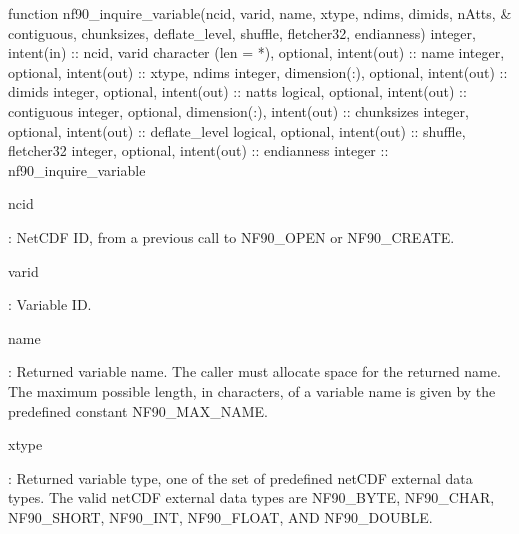\begin{DoxyCode}
\textcolor{keyword}{function }nf90\_inquire\_variable(ncid, varid, name, xtype, ndims, dimids, nAtts, &
     contiguous, chunksizes, deflate\_level, shuffle, fletcher32, endianness)
  \textcolor{keywordtype}{integer}, \textcolor{keywordtype}{intent(in)} :: ncid, varid
  \textcolor{keywordtype}{character (len = *)}, \textcolor{keywordtype}{optional}, \textcolor{keywordtype}{intent(out)} :: name
  \textcolor{keywordtype}{integer}, \textcolor{keywordtype}{optional}, \textcolor{keywordtype}{intent(out)} :: xtype, ndims
  \textcolor{keywordtype}{integer}, \textcolor{keywordtype}{dimension(:)}, \textcolor{keywordtype}{optional}, \textcolor{keywordtype}{intent(out)} :: dimids
  \textcolor{keywordtype}{integer}, \textcolor{keywordtype}{optional}, \textcolor{keywordtype}{intent(out)} :: natts
  \textcolor{keywordtype}{logical}, \textcolor{keywordtype}{optional}, \textcolor{keywordtype}{intent(out)} :: contiguous
  \textcolor{keywordtype}{integer}, \textcolor{keywordtype}{optional}, \textcolor{keywordtype}{dimension(:)}, \textcolor{keywordtype}{intent(out)} :: chunksizes
  \textcolor{keywordtype}{integer}, \textcolor{keywordtype}{optional}, \textcolor{keywordtype}{intent(out)} :: deflate\_level
  \textcolor{keywordtype}{logical}, \textcolor{keywordtype}{optional}, \textcolor{keywordtype}{intent(out)} :: shuffle, fletcher32
  \textcolor{keywordtype}{integer}, \textcolor{keywordtype}{optional}, \textcolor{keywordtype}{intent(out)} :: endianness
  \textcolor{keywordtype}{integer} :: nf90\_inquire\_variable
\end{DoxyCode}


{\ttfamily ncid}

\+: Net\+C\+DF ID, from a previous call to N\+F90\+\_\+\+O\+P\+EN or N\+F90\+\_\+\+C\+R\+E\+A\+TE.

{\ttfamily varid}

\+: Variable ID.

{\ttfamily name}

\+: Returned variable name. The caller must allocate space for the returned name. The maximum possible length, in characters, of a variable name is given by the predefined constant N\+F90\+\_\+\+M\+A\+X\+\_\+\+N\+A\+ME.

{\ttfamily xtype}

\+: Returned variable type, one of the set of predefined net\+C\+DF external data types. The valid net\+C\+DF external data types are N\+F90\+\_\+\+B\+Y\+TE, N\+F90\+\_\+\+C\+H\+AR, N\+F90\+\_\+\+S\+H\+O\+RT, N\+F90\+\_\+\+I\+NT, N\+F90\+\_\+\+F\+L\+O\+AT, A\+ND N\+F90\+\_\+\+D\+O\+U\+B\+LE.

